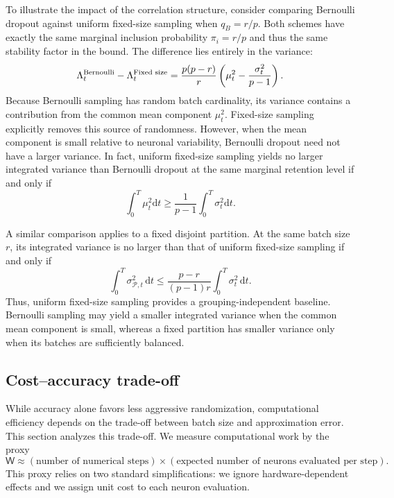 \documentclass[twoside,11pt]{article}
\theoremstyle{plain}
\newcommand{\diff}{\mathrm{d}}
\begin{document}
To illustrate the impact of the correlation structure, consider comparing Bernoulli dropout against uniform fixed-size sampling when $q_B = r/p$. Both schemes have exactly the same marginal inclusion probability $\pi_i = r/p$ and thus the same stability factor in the bound. The difference lies entirely in the variance:
\begin{equation*}
\Lambda_t^{\rm Bernoulli} - \Lambda_t^{\textrm{Fixed size}} = \frac{p(p-r)}{r}\left(\mu_t^2 - \frac{\sigma_t^2}{p-1}\right).
\end{equation*}
Because Bernoulli sampling has random batch cardinality, its variance contains a contribution from the common mean component $\mu_t^2$. Fixed-size sampling explicitly removes this source of randomness. However, when the mean component is small relative to neuronal variability, Bernoulli dropout need not have a larger variance. In fact, uniform fixed-size sampling yields no larger integrated variance than Bernoulli dropout at the same marginal retention level if and only if $$\int_0^T \mu_t^2 \diff t \ge \frac{1}{p-1}\int_0^T \sigma_t^2 \diff t.$$

A similar comparison applies to a fixed disjoint partition. At the same
batch size $r$, its integrated variance is no larger than that of uniform
fixed-size sampling if and only if
\begin{equation*}
\int_0^T \sigma_{\mathcal P,t}^2\,\diff t
\leq
\frac{p-r}{(p-1)r}\int_0^T\sigma_t^2\,\diff t.
\end{equation*}
Thus, uniform fixed-size sampling provides a grouping-independent baseline.
Bernoulli sampling may yield a smaller integrated variance when the common mean component is small,
whereas a fixed partition has smaller variance only when its batches are
sufficiently balanced.


\subsection{Cost–accuracy trade-off}\label{sec:cost_accuracy}
While accuracy alone favors less aggressive randomization, computational efficiency depends on the trade-off between batch size and approximation error. This section analyzes this trade-off. We measure computational work by the proxy
\begin{equation*}
\mathsf W
\approx
(\text{number of numerical steps})
\times
(\text{expected number of neurons evaluated per step}).
\end{equation*}
This proxy relies on two standard simplifications: we ignore hardware-dependent effects and we assign unit cost to each neuron evaluation. 
\end{document}
